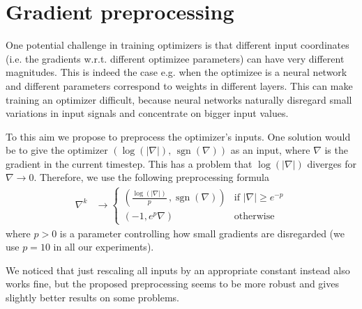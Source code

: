 \documentclass{article}
\begin{document}


{
\setlength{\bibsep}{0.4pt}
\renewcommand{\bibfont}{\small}
\titlespacing*{\section}{0pt}{0pt}{0pt}


}

\newpage
\appendix

\section{Gradient preprocessing}\label{sec:pre}

One potential challenge in training optimizers is that different input coordinates (i.e. the gradients w.r.t. different
optimizee parameters) can have very different magnitudes.
This is indeed the case e.g. when the optimizee is a neural network and different parameters
correspond to weights in different layers.
This can make training an optimizer difficult, because neural networks
naturally disregard small variations in input signals and concentrate on bigger input values.

To this aim we propose to preprocess the optimizer's inputs.
One solution would be to give the optimizer $\left(\log(|\nabla|),\,\operatorname{sgn}(\nabla)\right)$ as an input, where
$\nabla$ is the gradient in the current timestep.
This has a problem that $\log(|\nabla|)$ diverges for $\nabla \rightarrow 0$.
Therefore, we use the following preprocessing formula 
\begin{align*}
    \nabla^k &\rightarrow
\begin{cases}
    \left(\frac{\log(|\nabla|)}{p}\,, \operatorname{sgn}(\nabla)\right)& \text{if } |\nabla| \geq e^{-p}\\
    (-1, e^p \nabla)             & \text{otherwise}
\end{cases}
\end{align*}
where $p>0$ is a parameter controlling how small gradients are disregarded (we use $p=10$ in all our experiments).

We noticed that just rescaling all inputs by an appropriate constant instead also works fine, but
the proposed preprocessing seems to be more robust and gives slightly better results on some problems.
\end{document}
